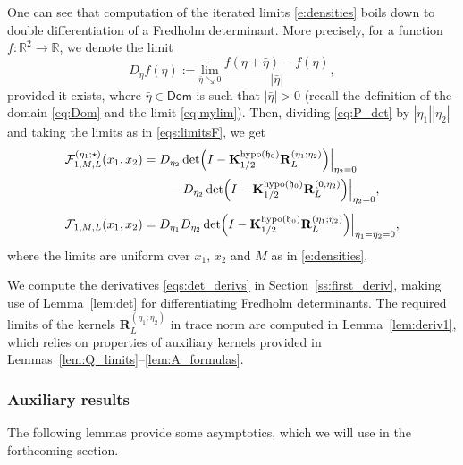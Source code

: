 \documentclass[oneside,final,11pt]{amsart}
\theoremstyle{definition}
\newcommand{\fh}{\mathfrak{h}}
\newcommand{\Dom}{\mathsf{Dom}}
\newcommand{\mylim}[1]{\underset{#1}{\wt{\mathrm{lim}}}}
\newcommand{\R}{\mathbb{R}}
\newcommand{\dens}{\CF}
\newcommand{\1}[1]{\mathbf{1}_{#1}}
\newcommand{\wt}{\widetilde}
\newcommand{\uptext}[1]{\text{\upshape{#1}}}
\DeclareMathOperator{\hypo}{\uptext{hypo}}
\newcommand{\fx}{x}
\newcommand{\fM}{M}
\newcommand{\fK}{\mathbf{K}}
\newcommand{\fR}{\mathbf{R}}
\newcommand{\CF}{\mathcal{F}}
\numberwithin{equation}{section}
\begin{document}
One can see that computation of the iterated limits \eqref{e:densities} boils down to double differentiation of a Fredholm determinant. More precisely, for a function $f : \R^2 \to \R$, we denote the limit
\begin{equation}\label{eq:deriv_eta}
D_\eta f(\eta) := \mylim{\bar \eta \searrow 0} \,\frac{f(\eta + \bar \eta) - f(\eta)}{|\bar \eta|},
\end{equation}
provided it exists, where $\bar \eta \in \Dom$ is such that $|\bar \eta| > 0$ (recall the definition of the domain \eqref{eq:Dom} and the limit \eqref{eq:mylim}). Then, dividing \eqref{eq:P_det} by $|\eta_1| |\eta_2|$ and taking the limits as in \eqref{eqs:limitsF}, we get
%
\begin{equation}
\begin{split}
\dens^{(\eta_1; \star)}_{1, M, L}(x_1, x_2) &= D_{\eta_2} \det \Bigl(I-\fK^{\hypo(\fh_0)}_{1/2} \fR_L^{(\eta_1; \eta_2)}\Bigr) \Bigr|_{\eta_2 = 0}\\
&\qquad- D_{\eta_2} \det \Bigl(I-\fK^{\hypo(\fh_0)}_{1/2} \fR_L^{(0,  \eta_2)}\Bigr) \Bigr|_{\eta_2 = 0},\\[4pt]
\dens_{1, \fM, L}(\fx_1, \fx_2) &= D_{\eta_1} D_{\eta_2} \det \Bigl(I-\fK^{\hypo(\fh_0)}_{1/2} \fR_L^{(\eta_1; \eta_2)}\Bigr) \Bigr|_{\eta_1= \eta_2 = 0},
\end{split}\label{eqs:det_derivs}
\end{equation}
%
where the limits are uniform over $x_1$, $x_2$ and $M$ as in \eqref{e:densities}.

We compute the derivatives \eqref{eqs:det_derivs} in Section~\ref{ss:first_deriv}, making use of Lemma~\ref{lem:det} for differentiating Fredholm determinants. The required limits of the kernels $\fR_L^{(\eta_1; \eta_2)}$ in trace norm are computed in Lemma~\ref{lem:deriv1}, which relies on properties of auxiliary kernels provided in Lemmas~\ref{lem:Q_limits}--\ref{lem:A_formulas}.

 \subsubsection{Auxiliary results}
 \label{sec:Auxiliary}

The following lemmas provide some asymptotics, which we will use in the forthcoming section.
\end{document}
